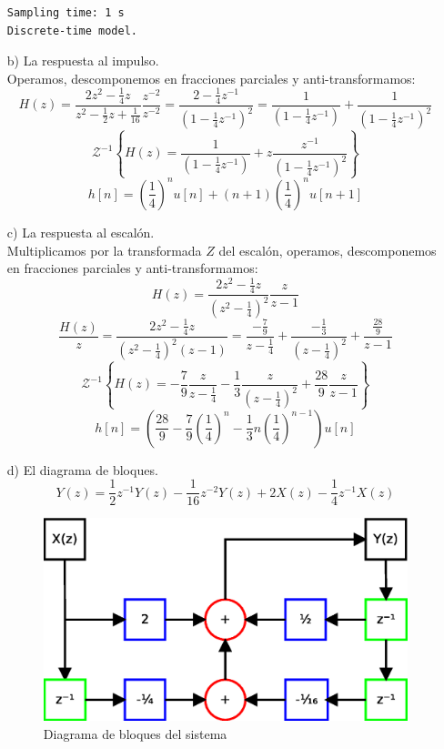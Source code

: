 \documentclass[a4paper,12pt]{article}
\begin{document}
\begin{itemize}
\begin{lstlisting}
Sampling time: 1 s
Discrete-time model.
        \end{lstlisting}
    \item[b)] La respuesta al impulso. \\
        Operamos, descomponemos en fracciones parciales y anti-transformamos:
        \[ H(z) = \frac{2z^2 - \frac{1}{4}z}{z^2 - \frac{1}{2}z + \frac{1}{16}}\frac{z^{-2}}{z^{-2}} = \frac{2 - \frac{1}{4}z^{-1}}{\left(1-\frac{1}{4}z^{-1}\right)^2} = \frac{1}{\left(1-\frac{1}{4}z^{-1}\right)} + \frac{1}{\left(1-\frac{1}{4}z^{-1}\right)^2} \]
        \[ \mathcal{Z}^{-1}\left\{H(z) = \frac{1}{\left(1-\frac{1}{4}z^{-1}\right)} + z\frac{z^{-1}}{\left(1-\frac{1}{4}z^{-1}\right)^2}\right\} \]
        \[ h[n] = \left(\frac{1}{4}\right)^n u[n] + (n+1)\left(\frac{1}{4}\right)^n u[n+1] \]
    \item[c)] La respuesta al escalón. \\
        Multiplicamos por la transformada $Z$ del escalón, operamos, descomponemos en fracciones parciales y anti-transformamos:
        \[ H(z) = \frac{2z^2 - \frac{1}{4}z}{\left(z^2 - \frac{1}{4}\right)^2}\frac{z}{z-1} \]
        \[ \frac{H(z)}{z} = \frac{2z^2 - \frac{1}{4}z}{\left(z^2 - \frac{1}{4}\right)^2\left(z-1\right)} = \frac{-\frac{7}{9}}{z-\frac{1}{4}} + \frac{-\frac{1}{3}}{\left(z-\frac{1}{4}\right)^2} + \frac{\frac{28}{9}}{z-1} \]
        \[ \mathcal{Z}^{-1}\left\{ H(z) = -\frac{7}{9}\frac{z}{z-\frac{1}{4}} - \frac{1}{3}\frac{z}{\left(z-\frac{1}{4}\right)^2} + \frac{28}{9}\frac{z}{z-1} \right\} \]
        \[ h[n] = \left( \frac{28}{9} - \frac{7}{9}\left(\frac{1}{4}\right)^n - \frac{1}{3}n\left(\frac{1}{4}\right)^{n-1}\right)u[n] \]
    \item[d)] El diagrama de bloques.
        \[ Y(z) = \frac{1}{2}z^{-1}Y(z) - \frac{1}{16}z^{-2}Y(z) + 2X(z) - \frac{1}{4}z^{-1}X(z) \]
        \begin{figure}[H]
            \begin{center}
                \includegraphics[width=0.6\linewidth]{Diagrama2}
                \caption{Diagrama de bloques del sistema}
                \label{fig:Dia1}
            \end{center}
        \end{figure}
\end{itemize}
\end{document}
